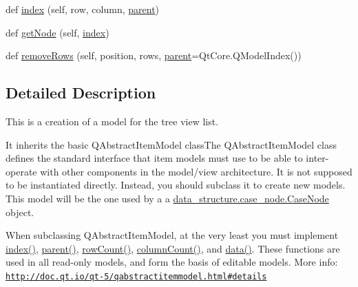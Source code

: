 \begin{DoxyCompactItemize}
\item 
def \hyperlink{classdata__structure_1_1case__model_1_1_case_model_a3c52ee6daea1dc2ce7bb23833c761ed2}{index} (self, row, column, \hyperlink{classdata__structure_1_1case__model_1_1_case_model_afa98c784f58d15bdb49c9ba85854ae03}{parent})
\item 
def \hyperlink{classdata__structure_1_1case__model_1_1_case_model_ad19222ac3eb114c51dce157ae50b2e19}{get\+Node} (self, \hyperlink{classdata__structure_1_1case__model_1_1_case_model_a3c52ee6daea1dc2ce7bb23833c761ed2}{index})
\item 
def \hyperlink{classdata__structure_1_1case__model_1_1_case_model_aa80631169f93be117b17729ae8fa7bf6}{remove\+Rows} (self, position, rows, \hyperlink{classdata__structure_1_1case__model_1_1_case_model_afa98c784f58d15bdb49c9ba85854ae03}{parent}=Qt\+Core.\+Q\+Model\+Index())
\end{DoxyCompactItemize}


\subsection{Detailed Description}
This is a creation of a model for the tree view list. 

It inherits the basic Q\+Abstract\+Item\+Model class\+The Q\+Abstract\+Item\+Model class defines the standard interface that item models must use to be able to inter-\/operate with other components in the model/view architecture. It is not supposed to be instantiated directly. Instead, you should subclass it to create new models. This model will be the one used by a a \hyperlink{classdata__structure_1_1case__node_1_1_case_node}{data\+\_\+structure.\+case\+\_\+node.\+Case\+Node} object.

When subclassing Q\+Abstract\+Item\+Model, at the very least you must implement \hyperlink{classdata__structure_1_1case__model_1_1_case_model_a3c52ee6daea1dc2ce7bb23833c761ed2}{index()}, \hyperlink{classdata__structure_1_1case__model_1_1_case_model_afa98c784f58d15bdb49c9ba85854ae03}{parent()}, \hyperlink{classdata__structure_1_1case__model_1_1_case_model_a44b390eef57be2a4883c1e6599b5a8ca}{row\+Count()}, \hyperlink{classdata__structure_1_1case__model_1_1_case_model_a132b1b7d95f07cae505b40b7fdeb4545}{column\+Count()}, and \hyperlink{classdata__structure_1_1case__model_1_1_case_model_a2f7291849d0efb3d7cff499d1cde0bf6}{data()}. These functions are used in all read-\/only models, and form the basis of editable models. More info\+: \href{http://doc.qt.io/qt-5/qabstractitemmodel.html#details}{\tt http\+://doc.\+qt.\+io/qt-\/5/qabstractitemmodel.\+html\#details} 

